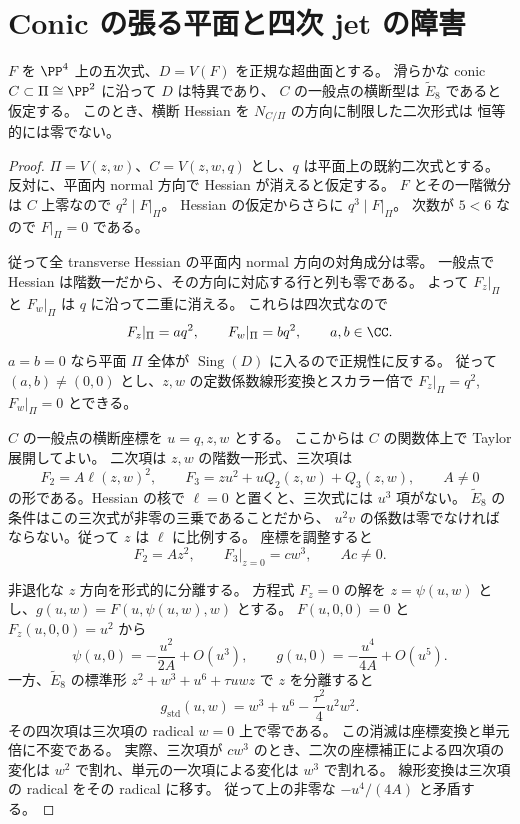 \section{Conic の張る平面と四次 jet の障害}

\begin{lemma}\label{lem:conic-plane}
$F$ を $\PP^4$ 上の五次式、$D=V(F)$ を正規な超曲面とする。
滑らかな conic $C\subset\Pi\cong\PP^2$ に沿って $D$ は特異であり、
$C$ の一般点の横断型は $\widetilde E_8$ であると仮定する。
このとき、横断 Hessian を $N_{C/\Pi}$ の方向に制限した二次形式は
恒等的には零でない。
\end{lemma}

\begin{proof}
$\Pi=V(z,w)$、$C=V(z,w,q)$ とし、$q$ は平面上の既約二次式とする。
反対に、平面内 normal 方向で Hessian が消えると仮定する。
$F$ とその一階微分は $C$ 上零なので $q^2\mid F|_\Pi$。
Hessian の仮定からさらに $q^3\mid F|_\Pi$。
次数が $5<6$ なので $F|_\Pi=0$ である。

従って全 transverse Hessian の平面内 normal 方向の対角成分は零。
一般点で Hessian は階数一だから、その方向に対応する行と列も零である。
よって $F_z|_\Pi$ と $F_w|_\Pi$ は $q$ に沿って二重に消える。
これらは四次式なので
\[
 F_z|_\Pi=a q^2,\qquad F_w|_\Pi=b q^2,\qquad a,b\in\CC.
\]
$a=b=0$ なら平面 $\Pi$ 全体が $\operatorname{Sing}(D)$ に入るので正規性に反する。
従って $(a,b)\ne(0,0)$ とし、$z,w$ の定数係数線形変換とスカラー倍で
$F_z|_\Pi=q^2$, $F_w|_\Pi=0$ とできる。

$C$ の一般点の横断座標を $u=q,z,w$ とする。
ここからは $C$ の関数体上で Taylor 展開してよい。
二次項は $z,w$ の階数一形式、三次項は
\[
 F_2=A\ell(z,w)^2,\qquad
 F_3=z u^2+u Q_2(z,w)+Q_3(z,w),\qquad A\ne0
\]
の形である。Hessian の核で $\ell=0$ と置くと、三次式には $u^3$ 項がない。
$\widetilde E_8$ の条件はこの三次式が非零の三乗であることだから、
$u^2v$ の係数は零でなければならない。従って $z$ は $\ell$ に比例する。
座標を調整すると
\[
 F_2=A z^2,\qquad F_3|_{z=0}=c w^3,\qquad A c\ne0.
\]

非退化な $z$ 方向を形式的に分離する。
方程式 $F_z=0$ の解を $z=\psi(u,w)$ とし、$g(u,w)=F(u,\psi(u,w),w)$ とする。
$F(u,0,0)=0$ と $F_z(u,0,0)=u^2$ から
\[
 \psi(u,0)=-\frac{u^2}{2A}+O(u^3),\qquad
 g(u,0)=-\frac{u^4}{4A}+O(u^5).
\]
一方、$\widetilde E_8$ の標準形
$z^2+w^3+u^6+\tau uwz$ で $z$ を分離すると
\[
 g_{\mathrm{std}}(u,w)=w^3+u^6-\frac{\tau^2}{4}u^2w^2.
\]
その四次項は三次項の radical $w=0$ 上で零である。
この消滅は座標変換と単元倍に不変である。
実際、三次項が $c w^3$ のとき、二次の座標補正による四次項の変化は
$w^2$ で割れ、単元の一次項による変化は $w^3$ で割れる。
線形変換は三次項の radical をその radical に移す。
従って上の非零な $-u^4/(4A)$ と矛盾する。
\end{proof}


